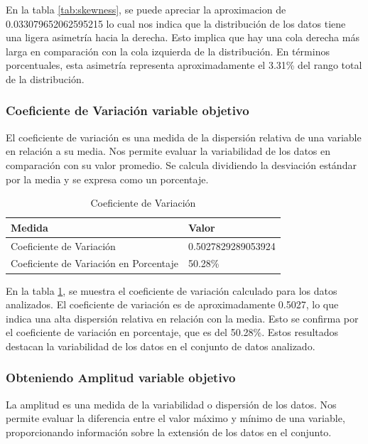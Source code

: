 En la tabla \ref{tab:skewness}, se puede apreciar la aproximacion de 0.033079652062595215 lo cual nos indica que la distribución de los datos tiene una ligera asimetría hacia la derecha. Esto implica que hay una cola derecha más larga en comparación con la cola izquierda de la distribución. En términos porcentuales, esta asimetría representa aproximadamente el 3.31\% del rango total de la distribución.

\subsubsection{Coeficiente de Variación variable objetivo}

El coeficiente de variación es una medida de la dispersión relativa de una variable en relación a su media. Nos permite evaluar la variabilidad de los datos en comparación con su valor promedio. Se calcula dividiendo la desviación estándar por la media y se expresa como un porcentaje.

\begin{table}[H]
    \centering
    \caption{Coeficiente de Variación}
    \begin{tabular}{ll}
        \hline
        \textbf{Medida}                        & \textbf{Valor}     \\
        \hline
        Coeficiente de Variación               & 0.5027829289053924 \\
        \hline
        Coeficiente de Variación en Porcentaje & 50.28\%            \\
        \hline
    \end{tabular}%
    \label{tab:coef_variacion}%
\end{table}%

En la tabla \ref{tab:coef_variacion}, se muestra el coeficiente de variación calculado para los datos analizados. El coeficiente de variación es de aproximadamente 0.5027, lo que indica una alta dispersión relativa en relación con la media. Esto se confirma por el coeficiente de variación en porcentaje, que es del 50.28\%. Estos resultados destacan la variabilidad de los datos en el conjunto de datos analizado.

\subsubsection{Obteniendo Amplitud variable objetivo}

La amplitud es una medida de la variabilidad o dispersión de los datos. Nos permite evaluar la diferencia entre el valor máximo y mínimo de una variable, proporcionando información sobre la extensión de los datos en el conjunto.

